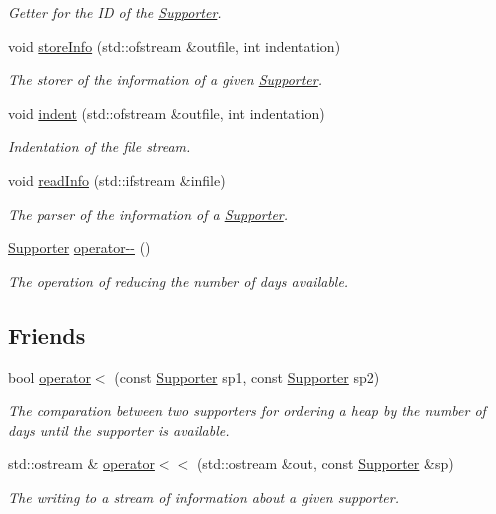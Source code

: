 \begin{DoxyCompactItemize}
\begin{DoxyCompactList}\small\item\em Getter for the ID of the \mbox{\hyperlink{class_supporter}{Supporter}}. \end{DoxyCompactList}\item 
void \mbox{\hyperlink{class_supporter_a83e75eda663c2dc14a60022e6e8f610f}{store\+Info}} (std\+::ofstream \&outfile, int indentation)
\begin{DoxyCompactList}\small\item\em The storer of the information of a given \mbox{\hyperlink{class_supporter}{Supporter}}. \end{DoxyCompactList}\item 
void \mbox{\hyperlink{class_supporter_a89df253d9584e976d6ab40533f79c3d8}{indent}} (std\+::ofstream \&outfile, int indentation)
\begin{DoxyCompactList}\small\item\em Indentation of the file stream. \end{DoxyCompactList}\item 
void \mbox{\hyperlink{class_supporter_ada44d7fddeaec2ec925faa375af7b29e}{read\+Info}} (std\+::ifstream \&infile)
\begin{DoxyCompactList}\small\item\em The parser of the information of a \mbox{\hyperlink{class_supporter}{Supporter}}. \end{DoxyCompactList}\item 
\mbox{\hyperlink{class_supporter}{Supporter}} \mbox{\hyperlink{class_supporter_a16db113edaeb5f727c27b85871d28506}{operator-\/-\/}} ()
\begin{DoxyCompactList}\small\item\em The operation of reducing the number of days available. \end{DoxyCompactList}\end{DoxyCompactItemize}
\subsection*{Friends}
\begin{DoxyCompactItemize}
\item 
bool \mbox{\hyperlink{class_supporter_ad9883859b49ffaaf1e59f8aee0089e11}{operator$<$}} (const \mbox{\hyperlink{class_supporter}{Supporter}} sp1, const \mbox{\hyperlink{class_supporter}{Supporter}} sp2)
\begin{DoxyCompactList}\small\item\em The comparation between two supporters for ordering a heap by the number of days until the supporter is available. \end{DoxyCompactList}\item 
std\+::ostream \& \mbox{\hyperlink{class_supporter_a7f6725df03a27dab255cbcef909e590e}{operator$<$$<$}} (std\+::ostream \&out, const \mbox{\hyperlink{class_supporter}{Supporter}} \&sp)
\begin{DoxyCompactList}\small\item\em The writing to a stream of information about a given supporter. \end{DoxyCompactList}\end{DoxyCompactItemize}


